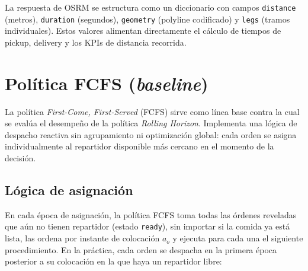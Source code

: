 \documentclass[12pt,letterpaper,oneside]{book}
\begin{document}
	La respuesta de OSRM se estructura como un diccionario con campos \texttt{distance} (metros), 
	\texttt{duration} (segundos), \texttt{geometry} (polyline codificado) y \texttt{legs} (tramos 
	individuales). Estos valores alimentan directamente el cálculo de tiempos de pickup, delivery 
	y los KPIs de distancia recorrida.

	\section{Política FCFS (\textit{baseline})}

	La política \textit{First-Come, First-Served} (FCFS) sirve como línea base contra la cual se
	evalúa el desempeño de la política \textit{Rolling Horizon}. Implementa una lógica de despacho reactiva 
	sin agrupamiento ni optimización global: cada orden se asigna individualmente al repartidor 
	disponible más cercano en el momento de la decisión.

	\subsection{Lógica de asignación}

	En cada época de asignación, la política FCFS toma todas las órdenes reveladas que aún no
	tienen repartidor (estado \texttt{ready}), sin importar si la comida ya está lista, las ordena
	por instante de colocación $a_o$ y ejecuta para cada una el siguiente procedimiento.  En
	la práctica, cada orden se despacha en la primera época posterior a su colocación en la que
	haya un repartidor libre:
\end{document}
